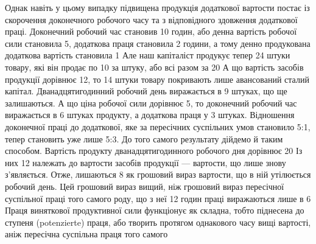 Однак навіть у цьому випадку підвищена продукція додаткової
вартости постає із скорочення доконечного робочого часу та
з відповідного здовження додаткової праці.  Доконечний робочий
час становив 10 годин, або денна вартість робочої сили становила
5, додаткова праця становила 2 години, а тому
денно продукована додаткова вартість становила 1 Але
наш капіталіст продукує тепер 24 штуки товару, які він продає
по 10 за штуку, або всі разом за 20 А що вартість
засобів продукції дорівнює 12, то 14 штуки товару
покривають лише авансований сталий капітал. Дванадцятигодинний
робочий день виражається в 9 штуках, що ще залишаються.
А що ціна робочої сили дорівнює 5, то доконечний робочий
час виражається в 6 штуках продукту, а додаткова праця
у 3 штуках. Відношення доконечної праці до додаткової, яке за
пересічних суспільних умов становило 5:1, тепер становить
уже лише 5:3. До того самого результату дійдемо й таким способом.
Вартість продукту дванадцятигодинного робочого дня
дорівнює 20 Із них 12 належать до вартости засобів
продукції — вартости, що лише знову з’являється. Отже, лишаються
8 як грошовий вираз вартости, що в ній утілюється робочий день.
Цей грошовий вираз вищий, ніж грошовий
вираз пересічної суспільної праці того самого роду, що з неї
12 годин праці виражаються лише в 6 Праця виняткової продуктивної сили
функціонує як складна, тобто піднесена
до ступеня (potenzierte) праця, або творить протягом однакового
часу вищі вартості, аніж пересічна суспільна праця того самого
